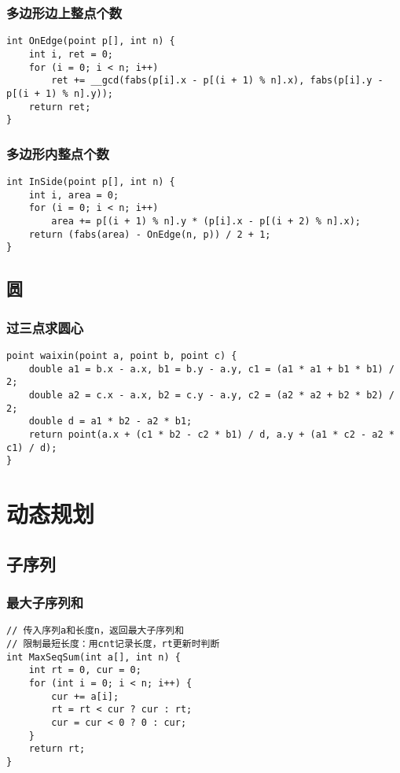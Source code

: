 \documentclass[a4]{article}
\begin{document}
\subsubsection{多边形边上整点个数}
\begin{lstlisting}
int OnEdge(point p[], int n) {
	int i, ret = 0;
	for (i = 0; i < n; i++)
		ret += __gcd(fabs(p[i].x - p[(i + 1) % n].x), fabs(p[i].y - p[(i + 1) % n].y));
	return ret;
}
\end{lstlisting}
\subsubsection{多边形内整点个数}
\begin{lstlisting}
int InSide(point p[], int n) {
	int i, area = 0;
	for (i = 0; i < n; i++) 
		area += p[(i + 1) % n].y * (p[i].x - p[(i + 2) % n].x);	
	return (fabs(area) - OnEdge(n, p)) / 2 + 1;
}
\end{lstlisting}
\subsection{圆}
\subsubsection{过三点求圆心}
\begin{lstlisting}
point waixin(point a, point b, point c) {
	double a1 = b.x - a.x, b1 = b.y - a.y, c1 = (a1 * a1 + b1 * b1) / 2;
	double a2 = c.x - a.x, b2 = c.y - a.y, c2 = (a2 * a2 + b2 * b2) / 2;
	double d = a1 * b2 - a2 * b1;
	return point(a.x + (c1 * b2 - c2 * b1) / d, a.y + (a1 * c2 - a2 * c1) / d);
}
\end{lstlisting}
\clearpage
\section{动态规划}
\subsection{子序列}
\subsubsection{最大子序列和}
\begin{lstlisting}
// 传入序列a和长度n，返回最大子序列和
// 限制最短长度：用cnt记录长度，rt更新时判断
int MaxSeqSum(int a[], int n) {
	int rt = 0, cur = 0;
	for (int i = 0; i < n; i++) {
		cur += a[i];
		rt = rt < cur ? cur : rt;
		cur = cur < 0 ? 0 : cur;
	}
	return rt;
}
\end{lstlisting}
\end{document}
